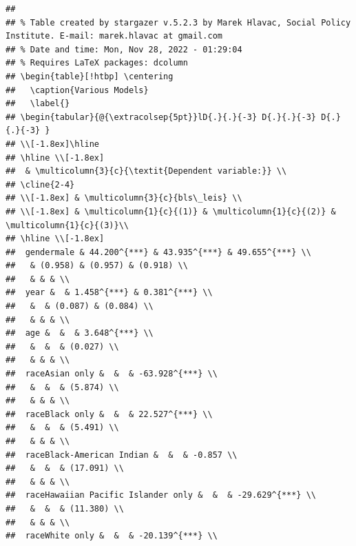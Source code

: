 \documentclass[
]{article}
\begin{document}
\begin{verbatim}
## 
## % Table created by stargazer v.5.2.3 by Marek Hlavac, Social Policy Institute. E-mail: marek.hlavac at gmail.com
## % Date and time: Mon, Nov 28, 2022 - 01:29:04
## % Requires LaTeX packages: dcolumn 
## \begin{table}[!htbp] \centering 
##   \caption{Various Models} 
##   \label{} 
## \begin{tabular}{@{\extracolsep{5pt}}lD{.}{.}{-3} D{.}{.}{-3} D{.}{.}{-3} } 
## \\[-1.8ex]\hline 
## \hline \\[-1.8ex] 
##  & \multicolumn{3}{c}{\textit{Dependent variable:}} \\ 
## \cline{2-4} 
## \\[-1.8ex] & \multicolumn{3}{c}{bls\_leis} \\ 
## \\[-1.8ex] & \multicolumn{1}{c}{(1)} & \multicolumn{1}{c}{(2)} & \multicolumn{1}{c}{(3)}\\ 
## \hline \\[-1.8ex] 
##  gendermale & 44.200^{***} & 43.935^{***} & 49.655^{***} \\ 
##   & (0.958) & (0.957) & (0.918) \\ 
##   & & & \\ 
##  year &  & 1.458^{***} & 0.381^{***} \\ 
##   &  & (0.087) & (0.084) \\ 
##   & & & \\ 
##  age &  &  & 3.648^{***} \\ 
##   &  &  & (0.027) \\ 
##   & & & \\ 
##  raceAsian only &  &  & -63.928^{***} \\ 
##   &  &  & (5.874) \\ 
##   & & & \\ 
##  raceBlack only &  &  & 22.527^{***} \\ 
##   &  &  & (5.491) \\ 
##   & & & \\ 
##  raceBlack-American Indian &  &  & -0.857 \\ 
##   &  &  & (17.091) \\ 
##   & & & \\ 
##  raceHawaiian Pacific Islander only &  &  & -29.629^{***} \\ 
##   &  &  & (11.380) \\ 
##   & & & \\ 
##  raceWhite only &  &  & -20.139^{***} \\ 

\end{verbatim}
\end{document}
